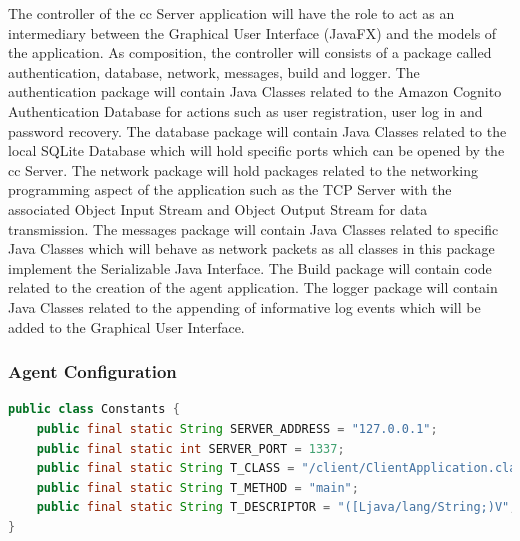 The controller of the \acrfull{cc} Server application will have the role to act as an
intermediary between the Graphical User Interface (JavaFX) and the models of the
application. As composition, the controller will consists of a package called
authentication, database, network, messages, build and logger. The authentication
package will contain Java Classes related to the Amazon Cognito Authentication Database
for actions such as user registration, user log in and password recovery. The database
package will contain Java Classes related to the local SQLite Database which will hold
specific ports which can be opened by the \acrfull{cc} Server. The network package will
hold packages related to the networking programming aspect of the application such as
the TCP Server with the associated Object Input Stream and Object Output Stream for data
transmission. The messages package will contain Java Classes related to specific Java
Classes which will behave as network packets as all classes in this package implement the
Serializable Java Interface. The Build package will contain code related to the creation
of the agent application. The logger package will contain Java Classes related to the
appending of informative log events which will be added to the Graphical User Interface.

\newpage
\subsubsection{Agent Configuration}

\begin{lstlisting}[language=Java, label={lst:agent-constants}, style=Oracle, columns=fullflexible,
caption=Agent (Client-Side) Constants Class,
captionpos=b]
public class Constants {
    public final static String SERVER_ADDRESS = "127.0.0.1";
    public final static int SERVER_PORT = 1337;
    public final static String T_CLASS = "/client/ClientApplication.class";
    public final static String T_METHOD = "main";
    public final static String T_DESCRIPTOR = "([Ljava/lang/String;)V";
}
\end{lstlisting}

